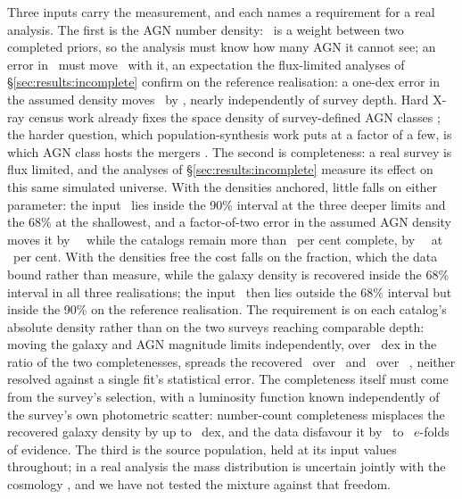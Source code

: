 Three inputs carry the measurement, and each names a requirement for a real
analysis. The first is the AGN number density: \fagn\ is a weight between two
completed priors, so the analysis must know how many AGN it cannot see; an
error in \nzagn\ must move \fagn\ with it, an expectation the flux-limited
analyses of \S\ref{sec:results:incomplete} confirm on the reference
realisation: a one-dex error in the
assumed density moves \fagn\ by \FagnDensitySlope, nearly independently of
survey depth. Hard X-ray census work
already fixes the space density of survey-defined AGN
classes \citep{Ananna2022}; the harder question, which
population-synthesis work puts at a factor of a few, is which AGN class hosts
the mergers \citep{McKernan2018, FordMcKernan2022}. The second is
completeness: a real survey is flux limited, and the analyses of
\S\ref{sec:results:incomplete} measure its effect on this same simulated
universe. With the densities anchored, little falls on either parameter:
the input \Hz\
lies inside the 90\% interval at the three deeper limits and the 68\% at
the shallowest, and a factor-of-two error in the assumed AGN density moves
it by \HzDensityShiftFactorTwoDeep~\kmsmpc\ while the catalogs remain more
than \CompMTwenty\ per cent complete, by \HzDensityShiftFactorTwo~\kmsmpc\
at \CompMEighteen\ per cent. With the densities free the cost falls on the
fraction, which the data bound rather than measure, while the galaxy
density is recovered inside the 68\% interval in all three realisations;
the input \Hz\ then lies outside the 68\% interval but inside the 90\% on
the reference realisation. The requirement is on each catalog's absolute
density rather than on the two surveys reaching comparable depth: moving
the galaxy and AGN magnitude limits independently, over
\RelCompletenessSpanDex~dex in the ratio of the two completenesses, spreads
the recovered \fagn\ over \FagnRelSpan\ and \Hz\ over \HzeroRelSpan~\kmsmpc,
neither resolved against a single fit's statistical error. The
completeness itself must come from the survey's selection, with a
luminosity function known independently of the survey's own photometric
scatter: number-count completeness misplaces the recovered galaxy density
by up to \PixelAnchorBiasMaxDex~dex, and the data disfavour it by
\SeedLnBFmin\ to \SeedLnBFmax\ $e$-folds of evidence. The third is the
source population, held at its input values throughout; in a real analysis
the mass distribution is uncertain jointly with the cosmology
\citep{GWTC3Cosmo2023}, and we have not tested the mixture against that
freedom.

